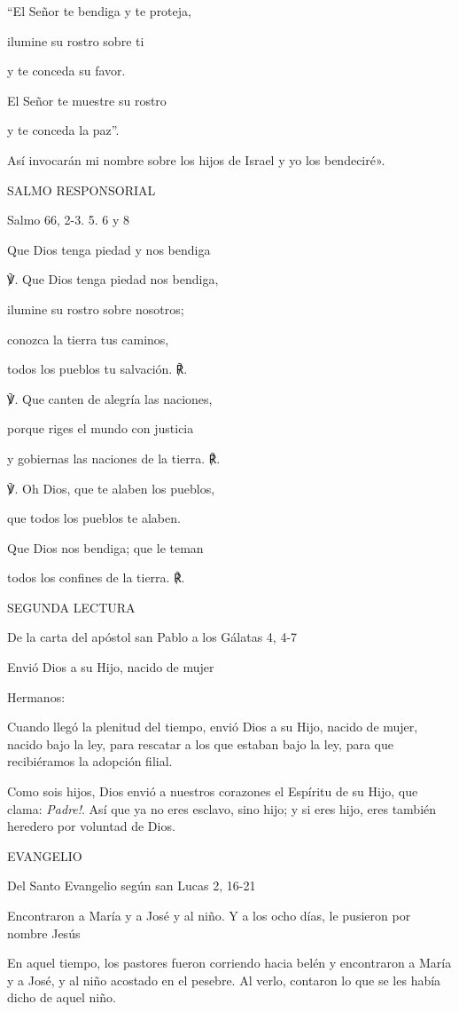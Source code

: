 ``El Señor te bendiga y te proteja,

ilumine su rostro sobre ti

y te conceda su favor.

El Señor te muestre su rostro

y te conceda la paz''.

Así invocarán mi nombre sobre los hijos de Israel y yo los bendeciré».

SALMO RESPONSORIAL

Salmo 66, 2-3. 5. 6 y 8

Que Dios tenga piedad y nos bendiga

℣. Que Dios tenga piedad nos bendiga,

ilumine su rostro sobre nosotros;

conozca la tierra tus caminos,

todos los pueblos tu salvación. ℟.

℣. Que canten de alegría las naciones,

porque riges el mundo con justicia

y gobiernas las naciones de la tierra. ℟.

℣. Oh Dios, que te alaben los pueblos,

que todos los pueblos te alaben.

Que Dios nos bendiga; que le teman

todos los confines de la tierra. ℟.

SEGUNDA LECTURA

De la carta del apóstol san Pablo a los Gálatas 4, 4-7

Envió Dios a su Hijo, nacido de mujer

Hermanos:

Cuando llegó la plenitud del tiempo, envió Dios a su Hijo, nacido de
mujer, nacido bajo la ley, para rescatar a los que estaban bajo la ley,
para que recibiéramos la adopción filial.

Como sois hijos, Dios envió a nuestros corazones el Espíritu de su Hijo,
que clama: \emph{ Padre!}. Así que ya no eres esclavo, sino
hijo; y si eres hijo, eres también heredero por voluntad de Dios.

EVANGELIO

Del Santo Evangelio según san Lucas 2, 16-21

Encontraron a María y a José y al niño. Y a los ocho días, le pusieron
por nombre Jesús

En aquel tiempo, los pastores fueron corriendo hacia belén y encontraron
a María y a José, y al niño acostado en el pesebre. Al verlo, contaron
lo que se les había dicho de aquel niño.

